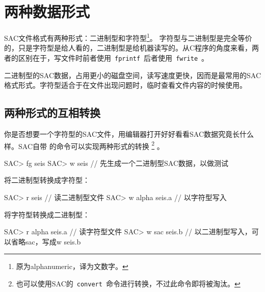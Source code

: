 \section{两种数据形式}
SAC文件格式有两种形式：二进制型和字符型\footnote{原为alphanumeric，译为文数字。}。
字符型与二进制型是完全等价的，只是字符型是给人看的，二进制型是给机器读写的。从C程序的角度来看，两者的区别在于，写文件时前者使用~\verb+fprintf+~后者使用~\verb+fwrite+~。

二进制型的SAC数据，占用更小的磁盘空间，读写速度更快，因而是最常用的SAC格式形式。字符型适合于在文件出现问题时，临时查看文件内容的时候使用。

\subsection{两种形式的互相转换}
你是否想要一个字符型的SAC文件，用编辑器打开好好看看SAC数据究竟长什么样。SAC自带
的命令可以实现两种形式的转换
\footnote{也可以使用SAC的~\verb+convert+~命令进行转换，不过此命令即将被淘汰。}
。
\begin{SACCode}
SAC> fg seis
SAC> w seis             // 先生成一个二进制型SAC数据，以做测试
\end{SACCode}

将二进制型转换成字符型：
\begin{SACCode}
SAC> r seis             // 读二进制型文件
SAC> w alpha seis.a     // 以字符型写入
\end{SACCode}

将字符型转换成二进制型：
\begin{SACCode}
SAC> r alpha seis.a     // 读字符型文件
SAC> w sac seis.b       // 以二进制型写入，可以省略sac，写成w seis.b
\end{SACCode}

